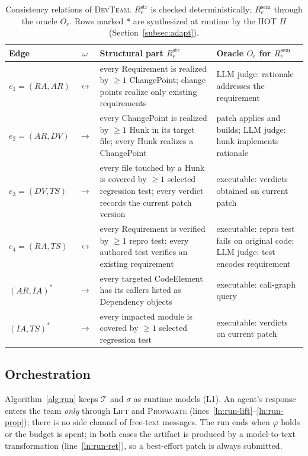 \documentclass[10pt, anonymous, conference]{IEEEtran}
\theoremstyle{definition}
\theoremstyle{plain}
\theoremstyle{remark}
\newcommand{\devteam}{\textsc{DevTeam}}
\newcommand{\team}{\mathcal{T}}
\newcommand{\str}{\mathrm{str}}
\newcommand{\sem}{\mathrm{sem}}
\newcommand{\cls}[1]{\textsf{#1}}
\begin{document}
\begin{table}[t]
\centering
\caption{Consistency relations of \devteam{}. $R_e^{\str}$ is checked
deterministically; $R_e^{\sem}$ through the oracle $O_e$. Rows marked $\ast$
are synthesized at runtime by the HOT $H$ (Section~\ref{subsec:adapt}).}
\label{tab:corr}
\footnotesize
\begin{tabular}{@{}l c p{} p{}@{}}
\toprule
Edge & $\omega$ & Structural part $R_e^{\str}$ & Oracle $O_e$ for $R_e^{\sem}$ \\
\midrule
$e_1{=}(\mathit{RA},\mathit{AR})$ & $\leftrightarrow$ &
every \cls{Requirement} is realized by $\ge1$ \cls{ChangePoint}; change points
realize only existing requirements &
LLM judge: rationale addresses the requirement \\
$e_2{=}(\mathit{AR},\mathit{DV})$ & $\rightarrow$ &
every \cls{ChangePoint} is realized by $\ge1$ \cls{Hunk} in its target file;
every \cls{Hunk} realizes a \cls{ChangePoint} &
patch applies and builds; LLM judge: hunk implements rationale \\
$e_3{=}(\mathit{DV},\mathit{TS})$ & $\rightarrow$ &
every file touched by a \cls{Hunk} is covered by $\ge1$ selected regression
test; every verdict records the current patch version &
executable: verdicts obtained on current patch \\
$e_4{=}(\mathit{RA},\mathit{TS})$ & $\leftrightarrow$ &
every \cls{Requirement} is verified by $\ge1$ repro test; every authored test
verifies an existing requirement &
executable: repro test fails on original code; LLM judge: test encodes
requirement \\
$(\mathit{AR},\mathit{IA})^{\ast}$ & $\rightarrow$ &
every targeted \cls{CodeElement} has its callers listed as \cls{Dependency}
objects & executable: call-graph query \\
$(\mathit{IA},\mathit{TS})^{\ast}$ & $\rightarrow$ &
every impacted module is covered by $\ge1$ selected regression test &
executable: verdicts on current patch \\
\bottomrule
\end{tabular}
\end{table}

\subsection{Orchestration}\label{subsec:run}
Algorithm~\ref{alg:run} keeps $\team$ and $\sigma$ as runtime models (L1). An
agent's response enters the team \emph{only} through \textsc{Lift} and
\textsc{Propagate} (lines~\ref{ln:run-lift}--\ref{ln:run-prop}); there is no
side channel of free-text messages. The run ends when $\varphi$ holds or the
budget is spent; in both cases the artifact is produced by a model-to-text
transformation (line~\ref{ln:run-ret}), so a best-effort patch is always
submitted.
\end{document}
